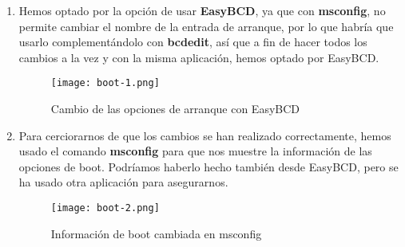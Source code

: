 \begin{enumerate}
    \item Hemos optado por la opción de usar \textbf{EasyBCD}, ya que con \textbf{msconfig}, no permite cambiar el nombre de la entrada de arranque, por lo que habría que usarlo complementándolo con \textbf{bcdedit}, así que a fin de hacer todos los cambios a la vez y con la misma aplicación, hemos optado por EasyBCD.

    \begin{figure}[H]
        \centering
        \texttt{[image: boot-1.png]}
        \caption{Cambio de las opciones de arranque con EasyBCD}
    \end{figure}

    \item Para cerciorarnos de que los cambios se han realizado correctamente, hemos usado el comando \textbf{msconfig} para que nos muestre la información de las opciones de boot. Podríamos haberlo hecho también desde EasyBCD, pero se ha usado otra aplicación para asegurarnos.

    \begin{figure}[H]
        \centering
        \texttt{[image: boot-2.png]}
        \caption{Información de boot cambiada en msconfig}
    \end{figure}
\end{enumerate}


\newpage



